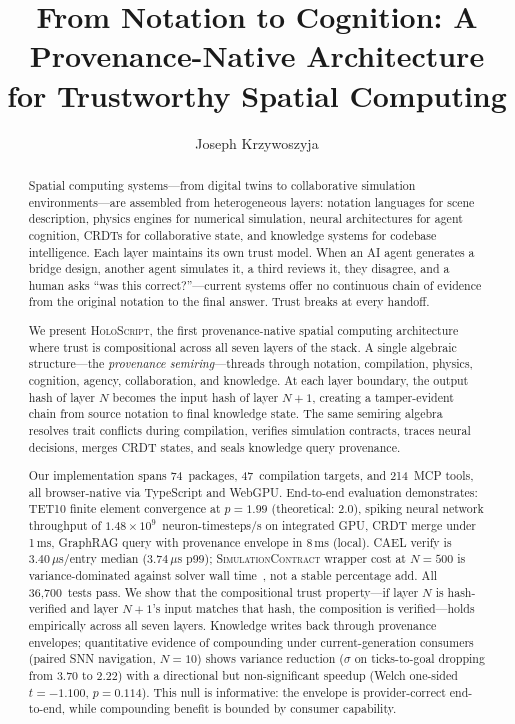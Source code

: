 \documentclass[sigchi-a]{acmart}
\newcommand{\holoscript}{\textsc{HoloScript}}
\newcommand{\simcontract}{\textsc{SimulationContract}}
\begin{document}
\title{From Notation to Cognition: A Provenance-Native Architecture for Trustworthy Spatial Computing}

\author{Joseph Krzywoszyja}

\begin{abstract}
Spatial computing systems---from digital twins to collaborative simulation
environments---are assembled from heterogeneous layers: notation languages for
scene description, physics engines for numerical simulation, neural architectures
for agent cognition, CRDTs for collaborative state, and knowledge systems for
codebase intelligence. Each layer maintains its own trust model. When an AI agent
generates a bridge design, another agent simulates it, a third reviews it, they
disagree, and a human asks ``was this correct?''---current systems offer no
continuous chain of evidence from the original notation to the final answer.
Trust breaks at every handoff.

We present \holoscript{}, the first provenance-native spatial computing
architecture where trust is compositional across all seven layers of the stack.
A single algebraic structure---the \emph{provenance semiring}---threads through
notation, compilation, physics, cognition, agency, collaboration, and knowledge.
At each layer boundary, the output hash of layer $N$ becomes the input hash of
layer $N{+}1$, creating a tamper-evident chain from source notation to final
knowledge state. The same semiring algebra resolves trait conflicts during
compilation, verifies simulation contracts, traces neural decisions, merges
CRDT states, and seals knowledge query provenance.

Our implementation spans 74~packages, 47~compilation targets, and
214~MCP tools, all browser-native via TypeScript and WebGPU. End-to-end evaluation
demonstrates: TET10 finite element convergence at $p=1.99$ (theoretical: 2.0),
spiking neural network throughput of $1.48 \times 10^9$~neuron-timesteps/s on
integrated GPU, CRDT merge under 1\,ms, GraphRAG query with provenance envelope in
8\,ms (local). CAEL verify is $3.40\,\mu$s/entry median ($3.74\,\mu$s p99);
\simcontract{} wrapper cost at $N{=}500$ is variance-dominated against solver
wall time~\cite{mcp-trust-paper}, not a stable percentage add.
All 36,700~tests pass. We show that the compositional trust property---if layer
$N$ is hash-verified and layer $N{+}1$'s input matches that hash, the composition
is verified---holds empirically across all seven layers.
Knowledge writes back through provenance envelopes; quantitative evidence of
compounding under current-generation consumers (paired SNN navigation, $N=10$)
shows variance reduction ($\sigma$ on ticks-to-goal dropping from $3.70$ to
$2.22$) with a directional but non-significant speedup
(Welch one-sided $t=-1.100$, $p=0.114$). This null is informative:
the envelope is provider-correct end-to-end, while compounding benefit is
bounded by consumer capability.
\end{abstract}
\end{document}
